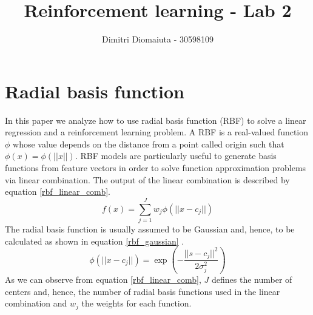 \documentclass[runningheads]{llncs}
\begin{document}
%
\title{Reinforcement learning - Lab 2}
%
%
\author{Dimitri Diomaiuta - 30598109}
%
%
%
\maketitle              %
%
%
%
%
\section{Radial basis function}\label{RBF}
In this paper we analyze how to use radial basis function (RBF) to
solve a linear regression and a reinforcement learning problem. A RBF
is a real-valued function $\phi$ whose value depends on the distance
from a point called origin such that $\phi(x) = \phi(||x||)$. RBF
models are particularly useful to generate basis functions from
feature vectors in order to solve function approximation problems via
linear combination. The output of the linear combination is described
by equation \ref{rbf_linear_comb}.
\begin{equation}\label{rbf_linear_comb}
  f(x) = \sum_{j=1}^{J}w_j\phi(||x-c_j||)
\end{equation}
The radial basis function is usually assumed to be Gaussian and,
hence, to be calculated as shown in equation \ref{rbf_gaussian}
\cite{rlbook}.
\begin{equation}\label{rbf_gaussian}
\phi(||x-c_j||) = \exp\left(-\frac{||s-c_j||^2}{2\sigma^2_j}\right)
\end{equation}
As we can observe from equation \ref{rbf_linear_comb}, $J$ defines the
number of centers and, hence, the number of radial basis functions used
in the linear combination and $w_j$ the weights for each function.
\end{document}
